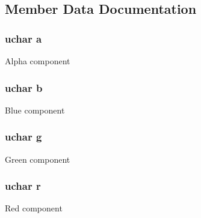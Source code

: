\subsection{Member Data Documentation}
\hypertarget{struct_color_ac4b9d51a5d2ecc82aa55bff73e6c088d}{
\subsubsection[{a}]{\setlength{\rightskip}{0pt plus 5cm}uchar a}}\label{struct_color_ac4b9d51a5d2ecc82aa55bff73e6c088d}
Alpha component \hypertarget{struct_color_a1257f1682341fca1120d6d2d6955bd7f}{
\subsubsection[{b}]{\setlength{\rightskip}{0pt plus 5cm}uchar b}}\label{struct_color_a1257f1682341fca1120d6d2d6955bd7f}
Blue component \hypertarget{struct_color_a33fc8a286048ddc401f94310eeeee25f}{
\subsubsection[{g}]{\setlength{\rightskip}{0pt plus 5cm}uchar g}}\label{struct_color_a33fc8a286048ddc401f94310eeeee25f}
Green component \hypertarget{struct_color_abca4da3a265e1fa1da7b86a7d3cc2eef}{
\subsubsection[{r}]{\setlength{\rightskip}{0pt plus 5cm}uchar r}}\label{struct_color_abca4da3a265e1fa1da7b86a7d3cc2eef}
Red component 